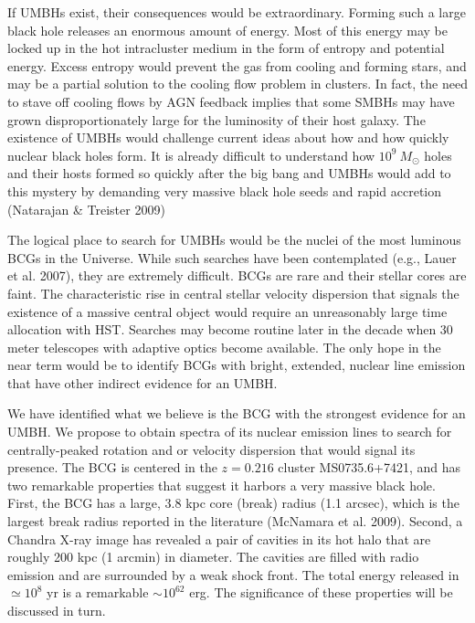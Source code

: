 \documentclass[12pt]{article}
\begin{document}
If UMBHs exist, their consequences would be extraordinary.   Forming such a large black hole releases an enormous amount of energy.  Most of this energy may be locked up in the
hot intracluster medium in the form of entropy and potential energy.  Excess entropy would
prevent the gas from cooling and forming stars, and may be a partial solution
to the cooling flow problem in clusters.  In fact, the need to stave off cooling flows by AGN feedback implies that some
SMBHs may have grown disproportionately large for the luminosity of their host galaxy.  The existence of
UMBHs would challenge current ideas about how and how quickly nuclear black holes form.   It is already difficult to understand how $10^9~M_\odot$ holes and their hosts formed so quickly after the big bang and UMBHs would
add to this mystery by demanding very massive black hole seeds and rapid accretion (Natarajan \& Treister 2009)


The logical place to search for UMBHs would be the nuclei of the most luminous BCGs in the Universe.  While such searches have been contemplated (e.g., Lauer et al. 2007), they are extremely difficult. BCGs are rare  and their stellar cores are faint.  The characteristic rise in central stellar velocity dispersion that signals the existence of
a massive central object would require an unreasonably large time allocation with HST.  Searches may become routine later in the decade when 30 meter telescopes with adaptive optics become available.  The only hope in the near term would be to identify BCGs with bright, extended, nuclear line emission that have other indirect evidence for an UMBH.  

We have identified what we believe is the BCG with the strongest evidence for an UMBH.   We propose to obtain spectra of its nuclear emission lines to search for centrally-peaked rotation and or velocity dispersion that would
signal its presence.  The BCG is centered in the $z=0.216$ cluster MS0735.6+7421, and has two remarkable properties that suggest it harbors a very massive black hole. First, the BCG has a large, $3.8$ kpc core (break) radius (1.1 arcsec), which is the largest  break radius reported in the literature (McNamara et al. 2009).  Second, a Chandra X-ray image has revealed a pair of cavities in its hot halo that are roughly 200 kpc (1 arcmin) in diameter.  The cavities are filled with radio emission and are surrounded by a weak shock front.  The total energy released in $\simeq 10^8$ yr is a remarkable $\sim 10^{62}$ erg.   
The significance of these properties will be discussed in turn. 
\end{document}
